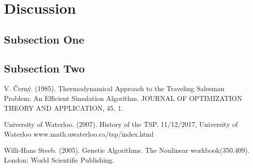 \documentclass[twoside,twocolumn]{article}
\begin{document}
  \section{Discussion}
  
  \subsection{Subsection One}
  
  \blindtext %
  
  \subsection{Subsection Two}
  
  \blindtext %
  
  
  \begin{thebibliography}{99} %
  
  
  V. Černý. (1985). 
  \newblock Thermodynamical Approach to the Traveling Salesman Problem: An Efficient Simulation Algorithm. 
  \newblock JOURNAL OF OPTIMIZATION THEORY AND APPLICATION, 45, 1.
  
  University of Waterloo. (2007). 
  \newblock History of the TSP. 11/12/2017, University of Waterloo
  \newblock www.math.uwaterloo.ca/tsp/index.html
  
  Willi-Hans Steeb. (2005). 
  \newblock Genetic Algorithms. 
  \newblock The Nonlinear workbook(350.409). London: World Scientific Publishing.
  
  \end{thebibliography}
  
  
  
\end{document}
